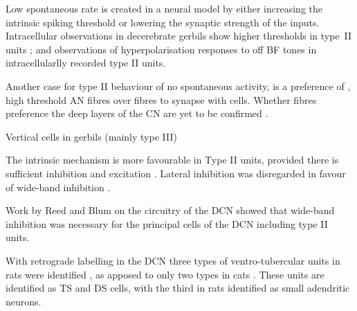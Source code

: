 Low spontaneous rate is created in a neural model by either
increasing the intrinsic spiking threshold or lowering the synaptic
strength of the inputs. Intracellular observations in decerebrate gerbils
show higher thresholds in type~II units \citep{DingVoigt:1997}; and
observations of hyperpolarisation responses to off \gls{BF} tones in
intracellularlly recorded type II units.

Another case for type II behaviour of no spontaneous activity, is a
preference of \LSR, high threshold AN fibres over \HSR fibres to synapse
with \TV cells. Whether \LSR fibres preference the deep layers of the CN
are yet to be confirmed
\citep{Ryugo:2008,MeltzerRyugo:2006,RyugoParks:2003,BabalianJacommeEtAl:2002}.

\smallskip{}

\citep{Rhode:1999} Vertical cells in gerbils (mainly type III)

\smallskip{}

The intrinsic mechanism is more favourable in Type II units, provided there
is sufficient inhibition and excitation
\citep{HancockDavisEtAl:1997}. Lateral inhibition was disregarded in favour
of wide-band inhibition \citep{HancockDavisEtAl:1997}.

\smallskip{}

Work by Reed and Blum
\citep{ReedBlum:1995,BlumReedEtAl:1995,ReedBlum:1997,BlumReed:1998} on the
circuitry of the DCN showed that wide-band inhibition was necessary for the
principal cells of the DCN including type II units.

\smallskip{}

With retrograde labelling in the DCN three types of ventro-tubercular units
in rats were identified \citet{FriedlandPongstapornEtAl:2003}, as apposed
to only two types in cats \citep{SmithRhode:1989,OertelWuEtAl:1990}. These
units are identified as TS and DS cells, with the third in rats identified
as small adendritic neurons.

\smallskip{}








